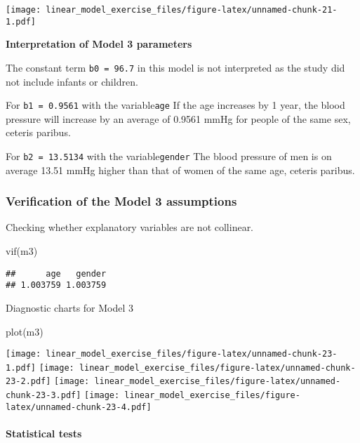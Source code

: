 \documentclass[
]{article}
\newenvironment{Shaded}{\begin{snugshade}}{\end{snugshade}}
\newcommand{\FunctionTok}[1]{\textcolor[rgb]{0.00,0.00,0.00}{#1}}
\newcommand{\NormalTok}[1]{#1}
\begin{document}
\texttt{[image: linear\_model\_exercise\_files/figure-latex/unnamed-chunk-21-1.pdf]}

\textbf{Interpretation of Model 3 parameters}

The constant term \texttt{b0\ =\ 96.7} in this model is not interpreted
as the study did not include infants or children.

For \texttt{b1\ =\ 0.9561} with the variable\texttt{age} If the age
increases by 1 year, the blood pressure will increase by an average of
0.9561 mmHg for people of the same sex, ceteris paribus.

For \texttt{b2\ =\ 13.5134} with the variable\texttt{gender} The blood
pressure of men is on average 13.51 mmHg higher than that of women of
the same age, ceteris paribus.

\hypertarget{verification-of-the-model-3-assumptions}{%
\subsubsection{Verification of the Model 3
assumptions}\label{verification-of-the-model-3-assumptions}}

Checking whether explanatory variables are not collinear.

\begin{Shaded}
\begin{Highlighting}[]
\FunctionTok{vif}\NormalTok{(m3)}
\end{Highlighting}
\end{Shaded}

\begin{verbatim}
##      age   gender 
## 1.003759 1.003759
\end{verbatim}

Diagnostic charts for Model 3

\begin{Shaded}
\begin{Highlighting}[]
\FunctionTok{plot}\NormalTok{(m3)}
\end{Highlighting}
\end{Shaded}

\texttt{[image: linear\_model\_exercise\_files/figure-latex/unnamed-chunk-23-1.pdf]}
\texttt{[image: linear\_model\_exercise\_files/figure-latex/unnamed-chunk-23-2.pdf]}
\texttt{[image: linear\_model\_exercise\_files/figure-latex/unnamed-chunk-23-3.pdf]}
\texttt{[image: linear\_model\_exercise\_files/figure-latex/unnamed-chunk-23-4.pdf]}

\hypertarget{statistical-tests-2}{%
\paragraph{Statistical tests}\label{statistical-tests-2}}
\end{document}

